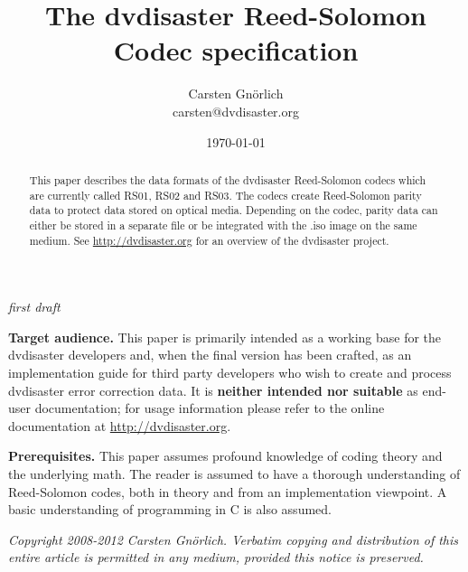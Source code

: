 \documentclass[12pt,a4paper,twoside]{article}
\newcommand{\paperversion}{{\em first draft}}
\begin{document}
\title{The dvdisaster Reed-Solomon Codec specification}
\author{Carsten Gnörlich\\carsten@dvdisaster.org}
\date{\today}
\maketitle
\thispagestyle{empty}
\begin{center}
\paperversion
\end{center}

\bigskip

\begin{abstract}
This paper describes the data formats of the dvdisaster Reed-Solomon codecs
which are currently called RS01, RS02 and RS03.
The codecs create Reed-Solomon parity data to protect data stored on optical media.
Depending on the codec, parity data can either be stored in a separate file 
or be integrated with the .iso image on the same medium. 
See \url{http://dvdisaster.org}  for an overview of the dvdisaster project. 
\end{abstract}

\bigskip

{\bf Target audience.} This paper is primarily intended as a working base for the
dvdisaster developers and, when the final version has been crafted, as an implementation
guide for third party developers who wish to create and process dvdisaster error correction data.
It is {\bf neither intended nor suitable} as end-user documentation; for usage information
please refer to the online documentation at \url{http://dvdisaster.org}.

\bigskip

{\bf Prerequisites.} This paper assumes profound knowledge of coding theory and the 
underlying math. The reader is assumed to have a thorough understanding of Reed-Solomon
codes, both in theory and from an implementation viewpoint. A basic understanding
of programming in C is also assumed.

\vfill
\begin{center}
{\em 
Copyright 2008-2012 Carsten Gnörlich.
Verbatim copying and distribution of this entire article is permitted in any medium, 
provided this notice is preserved.}
\end{center}

\newpage





\tableofcontents
\newpage









\appendix






\end{document}

